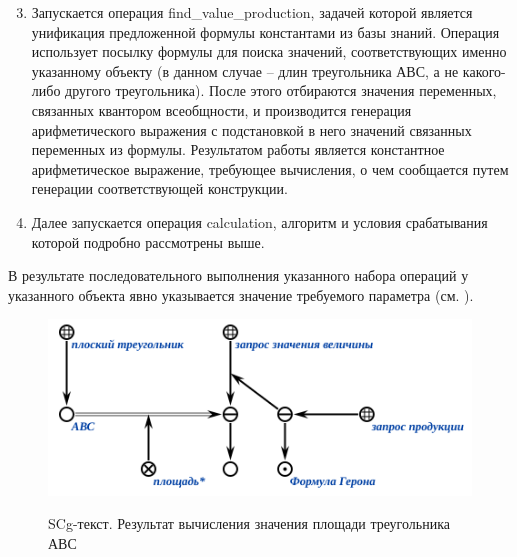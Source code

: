 \begin{enumerate}
	\setcounter{enumi}{2}
	\item
	Запускается операция find\_value\_production, задачей которой является унификация предложенной формулы константами из базы знаний. Операция использует посылку формулы для поиска значений, соответствующих именно указанному объекту (в данном случае -- длин треугольника АВС, а не какого-либо другого треугольника). После этого отбираются значения переменных, связанных квантором всеобщности, и производится генерация арифметического выражения с подстановкой в него значений связанных переменных из формулы. Результатом работы является константное арифметическое выражение, требующее вычисления, о чем сообщается путем генерации соответствующей конструкции.
	\item
	Далее запускается операция calculation, алгоритм и условия срабатывания которой подробно рассмотрены выше.
\end{enumerate}

В результате последовательного выполнения указанного набора операций у указанного объекта явно указывается значение требуемого параметра (см. ).

\begin{figure}[H]
	\caption{SCg-текст. Результат вычисления значения площади треугольника АВС}
	\includegraphics[scale=0.85]{images/part7/chapter_learning_systems/step4-kbe.png}
	\label{fig:step4}
\end{figure}
